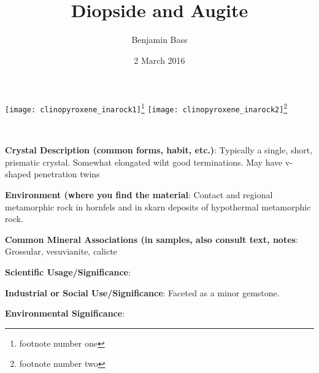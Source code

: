 \documentclass[10pt]{article}
\author{Benjamin Bass}
\date{2 March 2016}
\title{\vspace{-2.0cm}Diopside and Augite} %
\begin{document}
\maketitle


\begin{center}
  \texttt{[image: clinopyroxene\_inarock1]}\footnote{footnote number one}
  \texttt{[image: clinopyroxene\_inarock2]}\footnote{footnote number two}
\end{center}

\
\
\
\
\
\
\
\
\
\

\begin{framed}
  \textbf{Crystal Description (common forms, habit, etc.)}: Typically a single, short, prismatic crystal. Somewhat elongated wiht good terminations. May have v-shaped penetration twins
\end{framed}

\begin{framed}
  \textbf{Environment (where you find the material}: Contact and regional metamorphic rock in hornfels and in skarn deposits of hypothermal metamorphic rock.
\end{framed}

\begin{framed}
  \textbf{Common Mineral Associations (in samples, also consult text, notes}: Grossular, vesuvianite, calicte
\end{framed}

\begin{framed}
  \textbf{Scientific Usage/Significance}: 
\end{framed}

\begin{framed}
  \textbf{Industrial or Social Use/Significance}: Faceted as a minor gemstone.
\end{framed}

\begin{framed}
  \textbf{Environmental Significance}: 
\end{framed}

\end{document}
